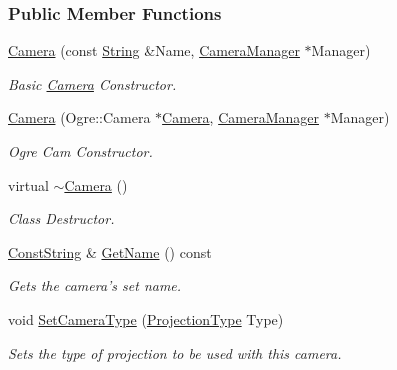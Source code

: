 \subsubsection*{Public Member Functions}
\begin{DoxyCompactItemize}
\item 
\hyperlink{classphys_1_1Camera_a863e7b7a0fb4db7969014d8391b5ca30}{Camera} (const \hyperlink{namespacephys_aa03900411993de7fbfec4789bc1d392e}{String} \&Name, \hyperlink{classphys_1_1CameraManager}{CameraManager} $\ast$Manager)
\begin{DoxyCompactList}\small\item\em Basic \hyperlink{classphys_1_1Camera}{Camera} Constructor. \item\end{DoxyCompactList}\item 
\hyperlink{classphys_1_1Camera_a0510d4f9bf6fb195115272cbd116e8dd}{Camera} (Ogre::Camera $\ast$\hyperlink{classphys_1_1Camera}{Camera}, \hyperlink{classphys_1_1CameraManager}{CameraManager} $\ast$Manager)
\begin{DoxyCompactList}\small\item\em Ogre Cam Constructor. \item\end{DoxyCompactList}\item 
virtual \hyperlink{classphys_1_1Camera_aa45f340a6f7ba0970aa2602a928463ea}{$\sim$Camera} ()
\begin{DoxyCompactList}\small\item\em Class Destructor. \item\end{DoxyCompactList}\item 
\hyperlink{namespacephys_a5ce5049f8b4bf88d6413c47b504ebb31}{ConstString} \& \hyperlink{classphys_1_1Camera_ae24490b8589796cb5f51d291cc418d84}{GetName} () const 
\begin{DoxyCompactList}\small\item\em Gets the camera's set name. \item\end{DoxyCompactList}\item 
void \hyperlink{classphys_1_1Camera_ac3a8ffec5fa70fa4981fc25815fdc8a3}{SetCameraType} (\hyperlink{classphys_1_1Camera_a87d8d46e9eb2080b10712079be69d86a}{ProjectionType} Type)
\begin{DoxyCompactList}\small\item\em Sets the type of projection to be used with this camera. \item\end{DoxyCompactList}\item 

\end{DoxyCompactItemize}
